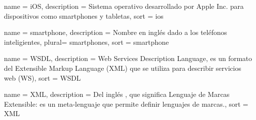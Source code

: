 \newpage

 {
  name = {iOS},
  description = {Sistema operativo desarrollado por Apple Inc. para dispositivos
  como smartphones y tabletas}, sort = {ios}
}

 {
  name = {smartphone},
  description = {Nombre en inglés dado a los teléfonos inteligientes},
  plural= {smartphones},
  sort = {smartphone}
}

 {
  name = {WSDL},
  description = {Web Services Description Language, es un formato del Extensible Markup Language (XML) que se utiliza para describir servicios web (WS)},
  sort = {WSDL}
}

 {
  name = {XML},
  description = {Del inglés , que significa Lenguaje de Marcas Extensible: es un meta-lenguaje que permite definir lenguajes de marcas.},
  sort = {XML}
}


